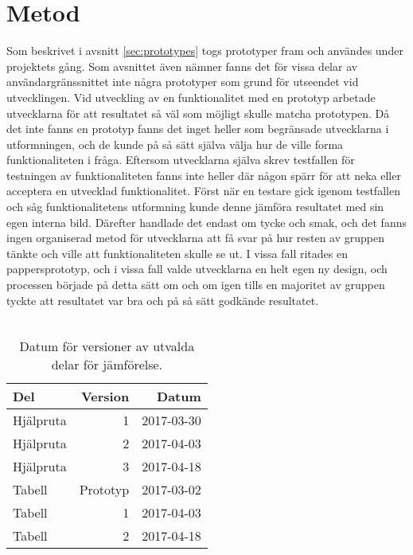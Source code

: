 \section{Metod}
\label{cha:rebecca-method}
Som beskrivet i avsnitt \ref{sec:prototypes} togs prototyper fram och användes under projektets gång. Som avsnittet även nämner fanns det för vissa delar av användargränssnittet inte några prototyper som grund för utseendet vid utvecklingen. Vid utveckling av en funktionalitet med en prototyp arbetade utvecklarna för att resultatet så väl som möjligt skulle matcha prototypen. Då det inte fanns en prototyp fanns det inget heller som begränsade utvecklarna i utformningen, och de kunde på så sätt själva välja hur de ville forma funktionaliteten i fråga. Eftersom utvecklarna själva skrev testfallen för testningen av funktionaliteten fanns inte heller där någon spärr för att neka eller acceptera en utvecklad funktionalitet. Först när en testare gick igenom testfallen och såg funktionalitetens utformning kunde denne jämföra resultatet med sin egen interna bild. Därefter handlade det endast om tycke och smak, och det fanns ingen organiserad metod för utvecklarna att få svar på hur resten av gruppen tänkte och ville att funktionaliteten skulle se ut. I vissa fall ritades en pappersprototyp, och i vissa fall valde utvecklarna en helt egen ny design, och processen började på detta sätt om och om igen tills en majoritet av gruppen tyckte att resultatet var bra och på så sätt godkände resultatet.
\\ \\
\begin{table}[h!]
	\caption{Datum för versioner av utvalda delar för jämförelse.}
  \def\arraystretch{1.5}
  \begin{adjustbox}{max width=\textwidth}
    \begin{tabularx}{\textwidth}{ | X | r | r |}
      \hline
      \textbf{Del} & \textbf{Version} & \textbf{Datum} \\
      \hline
      Hjälpruta & 1 & 2017-03-30 \\
      \hline
      Hjälpruta & 2 & 2017-04-03 \\
      \hline 
      Hjälpruta & 3 & 2017-04-18 \\
      \hline 
      Tabell & Prototyp & 2017-03-02 \\
      \hline
      Tabell & 1 & 2017-04-03 \\
      \hline
      Tabell & 2 & 2017-04-18 \\
      \hline 
    \end{tabularx}
  \end{adjustbox}
  \label{tab:prototypes-versions-date}
\end{table}
